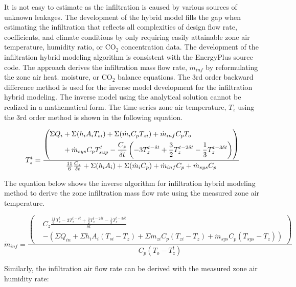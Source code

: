 It is not easy to estimate as the infiltration is caused by various sources of unknown leakages. The development of the hybrid model fills the gap when estimating the infiltration that reflects all complexities of design flow rate, coefficients, and climate conditions by only requiring easily attainable zone air temperature, humidity ratio, or CO$_2$ concentration data. The development of the infiltration hybrid modeling algorithm is consistent with the EnergyPlus source code. The approach derives the infiltration mass flow rate, $\dot{m}_{inf}$ by reformulating the zone air heat. moisture, or CO$_2$ balance equations. The 3rd order backward difference method is used for the inverse model development for the infiltration hybrid modeling. The inverse model using the analytical solution cannot be realized in a mathematical form. The time-series zone air temperature, $T_z$ using the 3rd order method is shown in the following equation.

\begin{equation}
T_z^t = \\ \frac {\left(\begin{aligned}\Sigma Q_i &+ \Sigma(h_i A_i T_{si}) + \Sigma (\dot{m}_i C_p T_{zi}) + \dot{m}_{inf} C_p T_o\\ &+ \dot{m}_{sys} C_p T_{sup}^t - \frac{C_z}{\delta t}\left(-3T_z^{t-\delta t} + \frac {3} {2} T_z^{t-2\delta t} - \frac {1} {3} T_z^{t-3\delta t}\right)\end{aligned}\right)} { \frac {11}{6} \frac {C_z} {\delta t} + \Sigma (h_i A_i)  + \Sigma (\dot{m}_i C_p) + \dot{m}_{inf} C_p + \dot{m}_{sys} C_p}
\end{equation}

The equation below shows the inverse algorithm for infiltration hybrid modeling method to derive the zone infiltration mass flow rate using the measured zone air temperature.

\begin{equation}
\dot{m}_{inf} = \frac{\left(\begin{aligned}& C_z\frac {\frac{11}{6}T_{z}^{t}-3T_{z}^{t-\delta t}+\frac{3}{2}T_{z}^{t-2\delta t}-\frac{1}{3}T_{z}^{t-3\delta t}} {\delta t}\\ & - \left(\Sigma{Q_{in}}+\Sigma{h_i A_i (T_{si}-T_z)} + \Sigma{\dot{m}_{zi}C_p(T_{zi}-T_z)} + \dot{m}_{sys}C_p(T_{sys} - T_z)\right)\end{aligned}\right)} {C_p(T_o - T_{z}^{t})}
\end{equation}

Similarly, the infiltration air flow rate can be derived with the measured zone air humidity rate:

